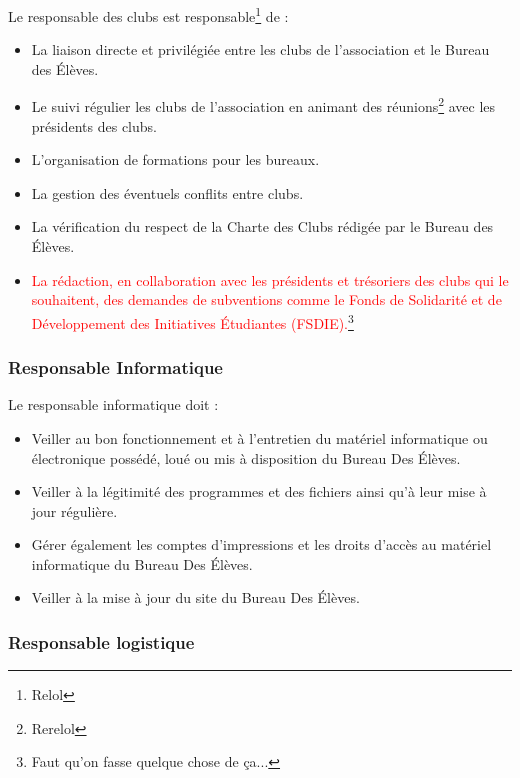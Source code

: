 \documentclass{article} %
\begin{document}
				Le responsable des clubs est responsable\footnote{Relol} de :
				\begin{itemize}
					\item La liaison directe et privilégiée entre les clubs de
						l’association et le Bureau des Élèves.
					\item Le suivi régulier les clubs de l’association en
						animant des réunions\footnote{Rerelol} avec les
						présidents des clubs.
					\item L’organisation de formations pour les bureaux.
					\item La gestion des éventuels conflits entre clubs.
					\item La vérification du respect de la Charte des Clubs
						rédigée par le Bureau des Élèves.
					\item \textcolor{red}{La rédaction, en collaboration avec
						les présidents et trésoriers des clubs qui le
						souhaitent, des demandes de subventions comme le Fonds
						de Solidarité et de Développement des Initiatives
						Étudiantes (FSDIE).}\footnote{Faut qu'on fasse quelque
						chose de ça...}
				\end{itemize}

			\subsubsection{Responsable Informatique}
				
				Le responsable informatique doit :
				\begin{itemize}
					\item Veiller au bon fonctionnement et à l’entretien du
						matériel informatique ou électronique possédé, loué ou
						mis à disposition du Bureau Des Élèves.
					\item Veiller à la légitimité des programmes et des fichiers
						ainsi qu’à leur mise à jour régulière.
					\item Gérer également les comptes d’impressions et les
						droits d’accès au matériel informatique du Bureau Des
						Élèves.
					\item Veiller à la mise à jour du site du Bureau Des Élèves.
				\end{itemize}

			\subsubsection{Responsable logistique}
\end{document}
